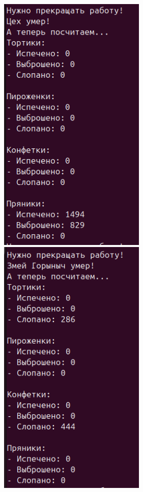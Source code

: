 \documentclass[a4paper,14pt]{extarticle}
\begin{document}
\includegraphics[width=70mm]{processes_output_4_4}
\includegraphics[width=70mm]{processes_output_4_5}
\end{document}
